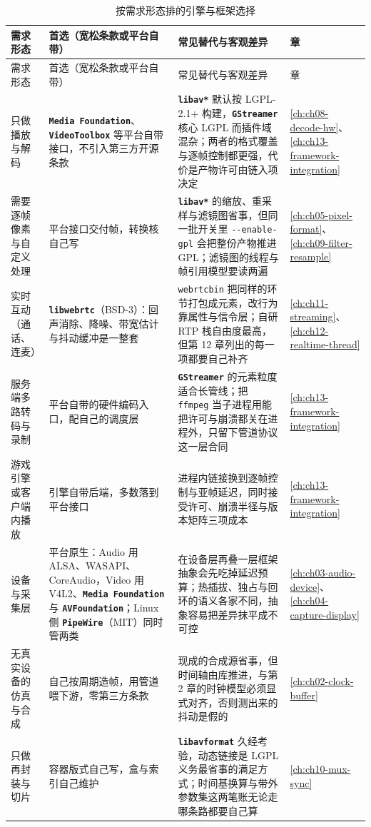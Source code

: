 \documentclass[12pt,a4paper,fontset=fandol]{ctexbook}
\newcommand{\Tp}[1]{\texttt{#1}}
\newcommand{\Opt}[1]{\texttt{-\/-#1}}
\newcommand{\Bk}{\discretionary{}{}{}}
\newcommand{\Lib}[1]{\textbf{\texttt{#1}}}
\newcommand{\Lang}[1]{\textsf{#1}}
\newcommand{\DomAud}{\Lang{Audio}}
\newcommand{\DomVid}{\Lang{Video}}
\begin{document}
\small
\begin{longtable}{>{\raggedright\arraybackslash}p{}
                  >{\raggedright\arraybackslash}p{}
                  >{\raggedright\arraybackslash}p{}
                  >{\raggedright\arraybackslash}p{}}
\caption{按需求形态排的引擎与框架选择}\label{tab:apC-engine} \\
\toprule
需求形态 & 首选（宽松条款或平台自带） & 常见替代与客观差异 & 章 \\
\midrule
\endfirsthead
\toprule
需求形态 & 首选（宽松条款或平台自带） & 常见替代与客观差异 & 章 \\
\midrule
\endhead
\midrule
\endfoot
\bottomrule
\endlastfoot
只做播放与解码 & \Lib{Media Foundation}、\Lib{Video{\Bk}Toolbox} 等平台自带接口，不引入第三方开源条款 & \Lib{libav*} 默认按 LGPL-2.1+ 构建，\Lib{GStreamer} 核心 LGPL 而插件域混杂；两者的格式覆盖与逐帧控制都更强，代价是产物许可由链入项决定 & \ref{ch:ch08-decode-hw}、\ref{ch:ch13-framework-integration} \\
需要逐帧像素与自定义处理 & 平台接口交付帧，转换核自己写 & \Lib{libav*} 的缩放、重采样与滤镜图省事，但同一批开关里 \Opt{enable-\Bk gpl} 会把整份产物推进 GPL；滤镜图的线程与帧引用模型要读两遍 & \ref{ch:ch05-pixel-format}、\ref{ch:ch09-filter-resample} \\
实时互动（通话、连麦） & \Lib{libwebrtc}（BSD-3）：回声消除、降噪、带宽估计与抖动缓冲是一整套 & \Tp{webrtcbin} 把同样的环节打包成元素，改行为靠属性与信令层；自研 RTP 栈自由度最高，但第 12 章列出的每一项都要自己补齐 & \ref{ch:ch11-streaming}、\ref{ch:ch12-realtime-thread} \\
服务端多路转码与录制 & 平台自带的硬件编码入口，配自己的调度层 & \Lib{GStreamer} 的元素粒度适合长管线；把 \Tp{ffmpeg} 当子进程用能把许可与崩溃都关在进程外，只留下管道协议这一层合同 & \ref{ch:ch13-framework-integration} \\
游戏引擎或客户端内播放 & 引擎自带后端，多数落到平台接口 & 进程内链接换到逐帧控制与亚帧延迟，同时接受许可、崩溃半径与版本矩阵三项成本 & \ref{ch:ch13-framework-integration} \\
设备与采集层 & 平台原生：\DomAud{} 用 ALSA、WASAPI、CoreAudio，\DomVid{} 用 V4L2、\Lib{Media Foundation} 与 \Lib{AV{\Bk}Foundation}；Linux 侧 \Lib{PipeWire}（MIT）同时管两类 & 在设备层再叠一层框架抽象会先吃掉延迟预算；热插拔、独占与回环的语义各家不同，抽象容易把差异抹平成不可控 & \ref{ch:ch03-audio-device}、\ref{ch:ch04-capture-display} \\
无真实设备的仿真与合成 & 自己按周期造帧，用管道喂下游，零第三方条款 & 现成的合成源省事，但时间轴由库推进，与第 2 章的时钟模型必须显式对齐，否则测出来的抖动是假的 & \ref{ch:ch02-clock-buffer} \\
只做再封装与切片 & 容器版式自己写，盒与索引自己维护 & \Lib{libav\Bk format} 久经考验，动态链接是 LGPL 义务最省事的满足方式；时间基换算与带外参数集这两笔账无论走哪条路都要自己算 & \ref{ch:ch10-mux-sync} \\
\end{longtable}
\normalsize
\end{document}
